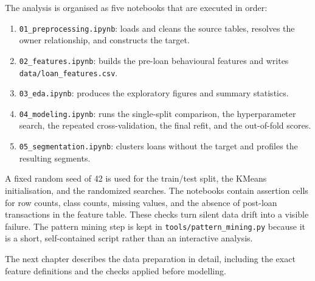 The analysis is organised as five notebooks that are executed in order:

\begin{enumerate}
    \item \texttt{01\_preprocessing.ipynb}: loads and cleans the source tables, resolves the owner relationship, and constructs the target.
    \item \texttt{02\_features.ipynb}: builds the pre-loan behavioural features and writes \texttt{data/loan\_features.csv}.
    \item \texttt{03\_eda.ipynb}: produces the exploratory figures and summary statistics.
    \item \texttt{04\_modeling.ipynb}: runs the single-split comparison, the hyperparameter search, the repeated cross-validation, the final refit, and the out-of-fold scores.
    \item \texttt{05\_segmentation.ipynb}: clusters loans without the target and profiles the resulting segments.
\end{enumerate}

A fixed random seed of 42 is used for the train/test split, the KMeans initialisation, and the randomized searches. The notebooks contain assertion cells for row counts, class counts, missing values, and the absence of post-loan transactions in the feature table. These checks turn silent data drift into a visible failure. The pattern mining step is kept in \texttt{tools/pattern\_mining.py} because it is a short, self-contained script rather than an interactive analysis.

The next chapter describes the data preparation in detail, including the exact feature definitions and the checks applied before modelling.
